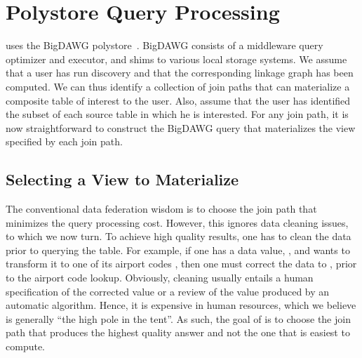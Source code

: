 \section{Polystore Query Processing}
\label{sec:curating}

\dcv uses the BigDAWG polystore~\cite{DBLP:journals/pvldb/ElmoreDSBCGHHKK15}. 
BigDAWG  consists of a middleware query optimizer and executor, and shims to various local storage systems.
We assume that a user has run discovery and that the corresponding linkage graph has been computed. 
We can thus identify a collection of join paths that can materialize a composite table of interest to the user.  
Also, assume that the user has identified the subset of each source table in which he is interested. 
For any join path, it is now straightforward to construct the BigDAWG query that materializes the view specified by each join path. 

\subsection{Selecting a View to Materialize}


The conventional data federation wisdom is to choose the join path that minimizes the query processing cost. However, this ignores data cleaning issues, to which we now turn.
To achieve high quality results, one has to clean the data prior to querying the table. 
For example, if one has a data value, , and wants to transform it to one of its airport codes , then one must correct the data to , prior to the airport code lookup. Obviously, cleaning usually entails a human specification of the corrected value or a review of the value produced by an automatic algorithm. Hence, it is expensive in human resources, which we believe is generally ``the high pole in the tent''. 
As such, the goal of \dcv is to choose the join path that produces the highest quality answer and not the one that is easiest to compute. 


